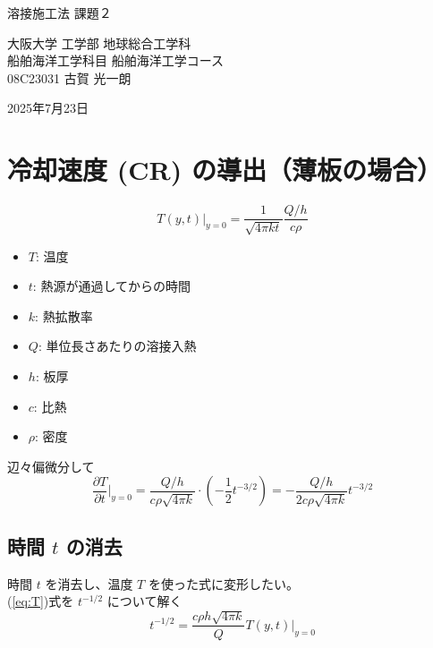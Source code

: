 \documentclass{article}
\begin{document}
\begin{center}
    {\huge 溶接施工法 課題２ \par}
    \vspace{1.5em}
    {\large 大阪大学 工学部 地球総合工学科 \\ 船舶海洋工学科目 船舶海洋工学コース \\ 08C23031 古賀 光一朗 \par}
    \vspace{1em}
    {\large 2025年7月23日\par}
\end{center}
\vspace{2em}


\section*{冷却速度 (CR) の導出（薄板の場合）}

\begin{equation}
\label{eq:T}
    T(y,t)|_{y=0} = \frac{1}{\sqrt{4\pi kt}} \frac{Q/h}{c\rho}
\end{equation}
\begin{itemize}
    \item $T$: 温度
    \item $t$: 熱源が通過してからの時間
    \item $k$: 熱拡散率
    \item $Q$: 単位長さあたりの溶接入熱
    \item $h$: 板厚
    \item $c$: 比熱
    \item $\rho$: 密度
\end{itemize}

\vspace{5mm}
辺々偏微分して
\begin{equation}
\label{eq:delta T}
    \frac{\partial T}{\partial t}|_{y=0} = \frac{Q/h}{c\rho\sqrt{4\pi k}} \cdot \left(-\frac{1}{2} t^{-3/2}\right) = -\frac{Q/h}{2c\rho\sqrt{4\pi k}} t^{-3/2}
\end{equation}

\subsection*{時間 $t$ の消去}
時間 $t$ を消去し、温度 $T$ を使った式に変形したい。\\
(\ref{eq:T})式を $t^{-1/2}$ について解く
\begin{equation}
\label{eq:t-12}
    t^{-1/2} = \frac{c\rho h \sqrt{4\pi k}}{Q} T(y,t)|_{y=0}
\end{equation}
\end{document}
